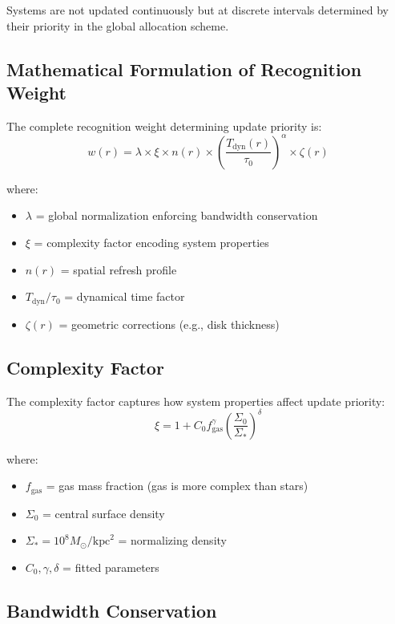\documentclass[12pt]{article}
\begin{document}
Systems are not updated continuously but at discrete intervals determined by their priority in the global allocation scheme.

\subsection{Mathematical Formulation of Recognition Weight}

The complete recognition weight determining update priority is:
\begin{equation}
w(r) = \lambda \times \xi \times n(r) \times \left(\frac{T_{\text{dyn}}(r)}{\tau_0}\right)^\alpha \times \zeta(r)
\end{equation}

where:
\begin{itemize}
\item $\lambda$ = global normalization enforcing bandwidth conservation
\item $\xi$ = complexity factor encoding system properties
\item $n(r)$ = spatial refresh profile
\item $T_{\text{dyn}}/\tau_0$ = dynamical time factor
\item $\zeta(r)$ = geometric corrections (e.g., disk thickness)
\end{itemize}

\subsection{Complexity Factor}

The complexity factor captures how system properties affect update priority:
\begin{equation}
\xi = 1 + C_0 f_{\text{gas}}^\gamma \left(\frac{\Sigma_0}{\Sigma_*}\right)^\delta
\end{equation}

where:
\begin{itemize}
\item $f_{\text{gas}}$ = gas mass fraction (gas is more complex than stars)
\item $\Sigma_0$ = central surface density
\item $\Sigma_* = 10^8 M_\odot/\text{kpc}^2$ = normalizing density
\item $C_0, \gamma, \delta$ = fitted parameters
\end{itemize}

\subsection{Bandwidth Conservation}
\end{document}
